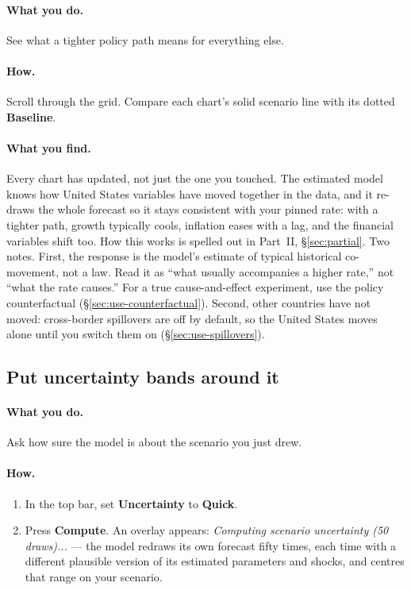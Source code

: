 \documentclass[11pt]{article}
\theoremstyle{definition}
\theoremstyle{remark}
\begin{document}
\paragraph{What you do.} See what a tighter policy path means for everything else.

\paragraph{How.} Scroll through the grid. Compare each chart's solid scenario line
with its dotted \textbf{Baseline}.

\paragraph{What you find.} Every chart has updated, not just the one you touched.
The estimated model knows how United States variables have moved together in the
data, and it re-draws the whole forecast so it stays consistent with your pinned
rate: with a tighter path, growth typically cools, inflation eases with a lag, and
the financial variables shift too. How this works is spelled out in Part~II,
\S\ref{sec:partial}. Two notes. First, the response is the model's estimate
of typical historical co-movement, not a law. Read it as ``what usually
accompanies a higher rate,'' not ``what the rate causes.'' For a true
cause-and-effect experiment, use the policy counterfactual
(\S\ref{sec:use-counterfactual}). Second, other countries have not moved: cross-border
spillovers are off by default, so the United States moves alone until you switch
them on (\S\ref{sec:use-spillovers}).

\subsection{Put uncertainty bands around it}

\paragraph{What you do.} Ask how sure the model is about the scenario you just
drew.

\paragraph{How.}
\begin{enumerate}
  \item In the top bar, set \textbf{Uncertainty} to \textbf{Quick}.
  \item Press \textbf{Compute}. An overlay appears: \emph{Computing scenario
    uncertainty (50 draws)...} --- the model redraws its own forecast fifty times,
    each time with a different plausible version of its estimated parameters and
    shocks, and centres that range on your scenario.
\end{enumerate}
\end{document}

